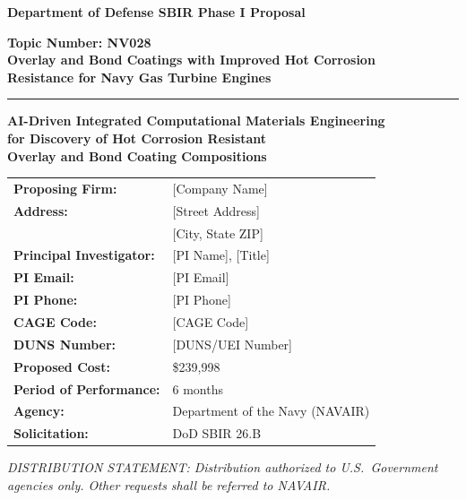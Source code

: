 \documentclass[11pt,letterpaper]{article}
\begin{document}

\begin{center}
\vspace*{1cm}

{\Large\textbf{\textcolor{navyblue}{Department of Defense SBIR Phase I Proposal}}}

\vspace{0.8cm}

{\large\textbf{Topic Number: NV028}}\\[0.3cm]
{\large\textbf{Overlay and Bond Coatings with Improved Hot Corrosion\\Resistance for Navy Gas Turbine Engines}}

\vspace{0.8cm}

\textcolor{navyblue}{\rule{0.8\textwidth}{1.5pt}}

\vspace{0.8cm}

{\Large\textbf{AI-Driven Integrated Computational Materials Engineering\\for Discovery of Hot Corrosion Resistant\\Overlay and Bond Coating Compositions}}

\vspace{1.0cm}

\begin{tabular}{ll}
\textbf{Proposing Firm:} & [Company Name] \\
\textbf{Address:} & [Street Address] \\
 & [City, State ZIP] \\
\textbf{Principal Investigator:} & [PI Name], [Title] \\
\textbf{PI Email:} & [PI Email] \\
\textbf{PI Phone:} & [PI Phone] \\
\textbf{CAGE Code:} & [CAGE Code] \\
\textbf{DUNS Number:} & [DUNS/UEI Number] \\
\textbf{Proposed Cost:} & \$239,998 \\
\textbf{Period of Performance:} & 6 months \\
\textbf{Agency:} & Department of the Navy (NAVAIR) \\
\textbf{Solicitation:} & DoD SBIR 26.B \\
\end{tabular}

\vspace{1.5cm}

{\small\textit{DISTRIBUTION STATEMENT: Distribution authorized to U.S.\ Government agencies only. Other requests shall be referred to NAVAIR.}}

\end{center}
\end{document}
